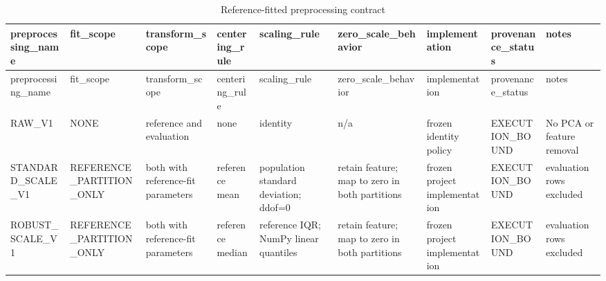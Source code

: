 \begin{longtable}{lllllllll}
\caption{Reference-fitted preprocessing contract}\\
\toprule
preprocessing\_name & fit\_scope & transform\_scope & centering\_rule & scaling\_rule & zero\_scale\_behavior & implementation & provenance\_status & notes \\
\midrule
\endfirsthead
\toprule
preprocessing\_name & fit\_scope & transform\_scope & centering\_rule & scaling\_rule & zero\_scale\_behavior & implementation & provenance\_status & notes \\
\midrule
\endhead
RAW\_V1 & NONE & reference and evaluation & none & identity & n/a & frozen identity policy & EXECUTION\_BOUND & No PCA or feature removal \\
STANDARD\_SCALE\_V1 & REFERENCE\_PARTITION\_ONLY & both with reference-fit parameters & reference mean & population standard deviation; ddof=0 & retain feature; map to zero in both partitions & frozen project implementation & EXECUTION\_BOUND & evaluation rows excluded \\
ROBUST\_SCALE\_V1 & REFERENCE\_PARTITION\_ONLY & both with reference-fit parameters & reference median & reference IQR; NumPy linear quantiles & retain feature; map to zero in both partitions & frozen project implementation & EXECUTION\_BOUND & evaluation rows excluded \\
\bottomrule
\end{longtable}

